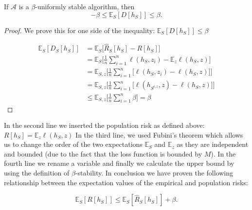 \documentclass{article}
\begin{document}
\begin{thm}\label{defec_bound}
If $\mathcal{A}$ is a $\beta$-uniformly stable algorithm, then 
\[
	-\beta \le \mathbb{E}_{S}[D[h_S]] \le \beta.
\]
\end{thm}
\begin{proof}
We prove this for one side of the inequality:  
	 $\mathbb{E}_{S}[D[h_S]] \le \beta$

\begin{align*}
    \mathbb{E}_S[D_{S}[h_S]]
    &=\mathbb{E}_S\Big[
    \hat R_S[h_S]-R[h_S]\Big]\\
    &=\mathbb{E}_S
    \Big[\frac{1}{n}\sum_{i=1}^n \ell(h_S,z_{i})-\mathbb{E}_z\ell(h_S,z)\Big]\\
    &=\mathbb{E}_{S,z}
    \Big[\frac{1}{n}\sum_{i=1}^n \Big[\ell(h_S,z_{i})-\ell(h_S,z)\Big]\Big]\\
    &=\mathbb{E}_{S,z}
    \Big[\frac{1}{n}\sum_{i=1}^n \Big[\ell(h_{S^{i,z}},z)-\ell(h_S,z)\Big]\Big]\\
    &\leq \mathbb{E}_{S,z}
    \Big[\frac{1}{n}\sum_{i=1}^n\beta\Big]=\beta
\end{align*}	 
\end{proof}
In the second line we inserted the population risk as defined  above: $R[h_S]=\mathbb{E}_z\ell(h_S,z)$ In the third line, we used Fubini's theorem which allows us to change the order of the two expectations $\mathbb{E}_{S}$ and $\mathbb{E}_{z}$ as they are independent and bounded (due to the fact that the loss function is bounded by $M$). In the fourth line we rename a variable and finally we calculate the upper bound by using the definition of $\beta$-stability.  In conclusion we have proven the following relationship between the expectation values of the empirical and population risks: 
\begin{prop}
\[
	\mathbb{E}_{S}[R[h_{S}]] \le \mathbb{E}_{S}[\hat{R}_{S}[h_S]] + \beta.
\]
\end{prop}








 
\end{document}
